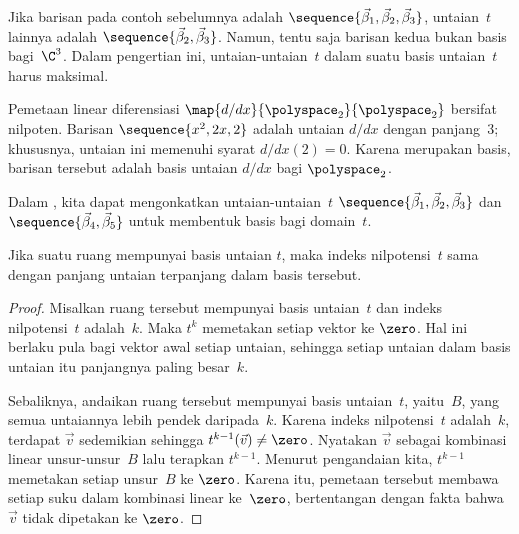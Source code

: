 Jika barisan pada contoh sebelumnya adalah
$\sequence{\vec{\beta}_1,
             \vec{\beta}_2,
             \vec{\beta}_3}$,
untaian~$t$ lainnya adalah
$\sequence{\vec{\beta}_2,
             \vec{\beta}_3}$.
Namun, tentu saja barisan kedua bukan basis bagi~$\C^3$.
Dalam pengertian ini, untaian-untaian~$t$ dalam suatu basis untaian~$t$
harus maksimal.

\begin{example}
Pemetaan linear diferensiasi
\( \map{d/dx}{\polyspace_2}{\polyspace_2} \)
bersifat nilpoten.
Barisan
\( \sequence{x^2, 2x, 2} \)
adalah untaian \( d/dx \) dengan panjang~\( 3 \);
khususnya, untaian ini memenuhi syarat $d/dx(2)=0$.
Karena merupakan basis, barisan tersebut
adalah basis untaian \( d/dx \) bagi \( \polyspace_2\).
\end{example}

\begin{example}
Dalam , kita dapat mengonkatkan untaian-untaian~$t$
$\sequence{\vec{\beta}_1,\vec{\beta}_2,\vec{\beta}_3}$ dan
$\sequence{\vec{\beta}_4,\vec{\beta}_5}$
untuk membentuk basis bagi domain~$t$.
\end{example}

\begin{lemma}  \label{le:LongestTowerIsIndex}
Jika suatu ruang mempunyai basis untaian \( t \), maka indeks nilpotensi~$t$
sama dengan panjang untaian terpanjang dalam basis tersebut.
\end{lemma}

\begin{proof}
Misalkan ruang tersebut mempunyai basis untaian~$t$ dan indeks
nilpotensi~$t$ adalah~$k$.
Maka \( t^k \) memetakan setiap vektor ke \( \zero \).
Hal ini berlaku pula bagi
vektor awal setiap untaian,
sehingga setiap untaian dalam basis untaian itu panjangnya paling besar~$k$.

Sebaliknya, andaikan ruang tersebut mempunyai basis untaian~$t$, yaitu~$B$,
yang semua untaiannya lebih pendek daripada~\( k \).
Karena indeks nilpotensi~$t$ adalah~$k$, terdapat \( \vec{v} \)
sedemikian sehingga \( t^{k-1}(\vec{v})\neq\zero \).
Nyatakan $\vec{v}$ sebagai kombinasi linear unsur-unsur~$B$
lalu terapkan \( t^{k-1} \).
Menurut pengandaian kita, \( t^{k-1} \) memetakan setiap unsur~$B$ ke \( \zero \).
Karena itu, pemetaan tersebut membawa setiap suku dalam kombinasi linear ke~$\zero$,
bertentangan dengan fakta bahwa \( \vec{v} \) tidak dipetakan ke \( \zero \).
\end{proof}

